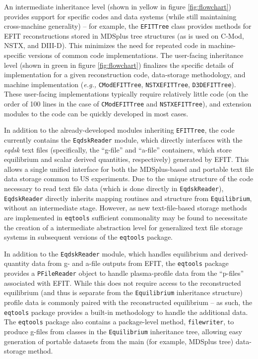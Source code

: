 \documentclass[12pt,floatfix,showpacs]{revtex4-1}
\newcommand{\eg}{\emph{e.g., }}
\newcommand{\eqtools}{\texttt{eqtools}\xspace}
\begin{document}
An intermediate inheritance level (shown in yellow in figure \ref{fig:flowchart}) provides support for specific codes and data systems (while still maintaining cross-machine generality) -- for example, the \verb|EFITTree| class provides methods for EFIT reconstructions stored in MDSplus tree structures (as is used on C-Mod, NSTX, and DIII-D).  
This minimizes the need for repeated code in machine-specific versions of common code implementations.  
The user-facing inheritance level (shown in green in figure \ref{fig:flowchart}) finalizes the specific details of implementation for a given reconstruction code, data-storage methodology, and machine implementation (\eg \verb|CModEFITTree|, \verb|NSTXEFITTree|, \verb|D3DEFITTree|).  
These user-facing implementations typically require relatively little code (on the order of 100 lines in the case of \verb|CModEFITTree| and \verb|NSTXEFITTree|), and extension modules to the code can be quickly developed in most cases.

In addition to the already-developed modules inheriting \verb|EFITTree|, the code currently contains the \verb|EqdskReader| module, which directly interfaces with the \emph{eqdsk} text files (specifically, the ``g-file'' and ``a-file'' containers, which store equilibrium and scalar derived quantities, respectively) generated by EFIT.  
This allows a single unified interface for both the MDSplus-based and portable text file data storage common to US experiments. 
Due to the unique structure of the code necessary to read text file data (which is done directly in \verb|EqdskReader|), \verb|EqdskReader| directly inherits mapping routines and structure from \verb|Equilibrium|, without an intermediate stage.
However, as new text-file-based storage methods are implemented in \eqtools sufficient commonality may be found to necessitate the creation of a intermediate abstraction level for generalized text file storage systems in subsequent versions of the \eqtools package.

In addition to the \verb|EqdskReader| module, which handles equilibrium and derived-quantity data from g- and a-file outputs from EFIT, the \eqtools package provides a \verb|PFileReader| object to handle plasma-profile data from the ``p-files'' associated with EFIT.  
While this does not require access to the reconstructed equilibrium (and thus is separate from the \verb|Equilibrium| inheritance structure) profile data is commonly paired with the reconstructed equilibrium -- as such, the \eqtools package provides a built-in methodology to handle the additional data.  
The \eqtools package also contains a package-level method, \verb|filewriter|, to produce g-files from classes in the \verb|Equilibrium| inheritance tree, allowing easy generation of portable datasets from the main (for example, MDSplus tree) data-storage method.
\end{document}
